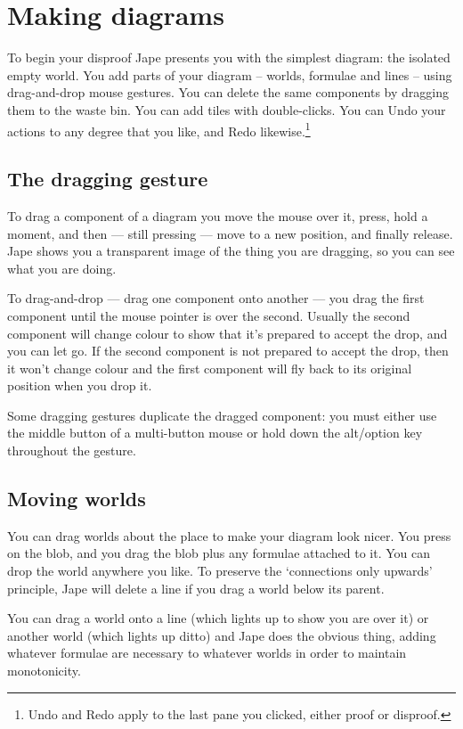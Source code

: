 \documentclass[11pt]{book}
\begin{document}
\section{Making diagrams}

To begin your disproof Jape presents you with the simplest diagram: the isolated empty world. You add parts of your diagram -- worlds, formulae and lines -- using drag-and-drop mouse gestures. You can delete the same components by dragging them to the waste bin. You can add tiles with double-clicks. You can Undo your actions to any degree that you like, and Redo likewise.\footnote{Undo and Redo apply to the last pane you clicked, either proof or disproof.} 

\subsection{The dragging gesture}

To drag a component of a diagram you move the mouse over it, press, hold a moment, and then --- still pressing --- move to a new position, and finally release. Jape shows you a transparent image of the thing you are dragging, so you can see what you are doing.

To drag-and-drop --- drag one component onto another --- you drag the first component until the mouse pointer is over the second. Usually the second component will change colour to show that it's prepared to accept the drop, and you can let go. If the second component is not prepared to accept the drop, then it won't change colour and the first component will fly back to its original position when you drop it.

Some dragging gestures duplicate the dragged component: you must either use the middle button of a multi-button mouse or hold down the alt/option key throughout the gesture.

\subsection{Moving worlds}

You can drag worlds about the place to make your diagram look nicer. You press on the blob, and you drag the blob plus any formulae attached to it. You can drop the world anywhere you like. To preserve the `connections only upwards' principle, Jape will delete a line if you drag a world below its parent.

You can drag a world onto a line (which lights up to show you are over it) or another world (which lights up ditto) and Jape does the obvious thing, adding whatever formulae are necessary to whatever worlds in order to maintain monotonicity.
\end{document}
